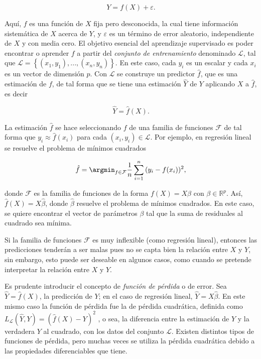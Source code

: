 \begin{equation}
  \label{eq:modelo_gral_aprendizaje}
  Y = f(X) + \varepsilon. 
\end{equation}

Aquí, $f$ es una función de $X$ fija pero desconocida, la cual tiene información sistemática de $X$ acerca de $Y$, y $\varepsilon$ es un término de error aleatorio, independiente de $X$ y con media cero. El objetivo esencial del aprendizaje supervisado es poder encontrar o aprender $f$ a partir del \textit{conjunto de entrenamiento} denominado $\mathcal{L}$, tal que $\mathcal{L} = \left\{ (x_1, y_1), ..., (x_n, y_n) \right\}$. En este caso, cada $y_i$ es un escalar y cada $x_i$ es un vector de dimensión $p$. Con $\mathcal{L}$ se construye un predictor $\hat{f}$, que es una estimación de $f$, de tal forma que se tiene una estimación $\hat{Y}$ de $Y$ aplicando $X$ a $\hat{f}$, es decir

$$\hat{Y} = \hat{f}(X).$$

La estimación $\hat{f}$ se hace seleccionando $f$ de una familia de funciones $\mathcal{F}$ de tal forma que $y_i \approx \hat{f}(x_i)$ para cada $(x_i, y_i) \in \mathcal{L}$. Por ejemplo, en regresión lineal se resuelve el problema de mínimos cuadrados

$$\hat{f} = \argmin_{f \in \mathcal{F}} \frac{1}{n} \sum_{i = 1}^n{ ( y_i - f(x_i) ) ^ 2},$$

donde $\mathcal{F}$ es la familia de funciones de la forma $f(X) = X\beta$ con $\beta \in \mathbb{R}^p$. Así, $\hat{f}(X) = X \hat{\beta}$, donde $\hat{\beta}$ resuelve el problema de mínimos cuadrados. En este caso, se quiere encontrar el vector de parámetros $\beta$ tal que la suma de residuales al cuadrado sea mínima.

Si la familia de funciones $\mathcal{F}$ es muy inflexible (como regresión lineal), entonces las predicciones tenderán a ser malas pues no se capta bien la relación entre $X$ y $Y$, sin embargo, esto puede ser deseable en algunos casos, como cuando se pretende interpretar la relación entre $X$ y $Y$.

Es prudente introducir el concepto de \textit{función de pérdida} o de error. Sea $\hat{Y} = \hat{f}(X)$, la predicción de $Y$; en el caso de regresión lineal, $\hat{Y} = X\hat{\beta}$. En este mismo caso la función de pérdida fue la de pérdida cuadrática, definida como 
$L_{\mathcal{L}}(\hat{Y}, Y) = (\hat{f}(X) - Y ) ^2$
, o sea, la diferencia entre la estimación de $Y$ y la verdadera $Y$ al cuadrado, con los datos del conjunto $\mathcal{L}$. Existen distintos tipos de funciones de pérdida, pero muchas veces se utiliza la pérdida cuadrática debido a las propiedades diferenciables que tiene.

